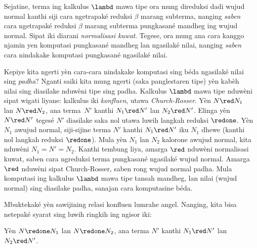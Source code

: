 \documentclass[../../../include/open-logic-section]{subfiles}
\begin{document}
Sejatine, terma ing kalkulus $\lambd$ mawa tipe ora mung direduksi dadi
wujud normal kanthi siji cara ngetrapaké reduksi $\beta$ marang
subterma, nanging \emph{saben} cara ngetrapaké reduksi $\beta$ marang
subterma pungkasané mandheg ing wujud normal. Sipat iki diarani
\emph{normalisasi kuwat}. Tegese, ora mung ana cara kanggo njamin yen
komputasi pungkasané mandheg lan ngasilaké nilai, nanging \emph{saben}
cara nindakake komputasi pungkasané ngasilaké nilai.

Kepiye kita ngerti yèn cara-cara nindakake komputasi sing béda ngasilaké
nilai sing \emph{padha}? Nganti saiki kita mung ngerti (saka panglestaren
tipe) yèn kabèh nilai sing diasilake nduwèni tipe sing padha. Kalkulus
$\lambd$ mawa tipe nduwèni sipat wigati liyane: kalkulus iki
\emph{konfluen}, utawa \emph{Church-Rosser}. Yèn $N \red N_1$ lan $N \red
N_2$, ana terma~$N'$ kanthi $N_1 \red N'$ lan $N_2 \red N'$. Elinga
yèn $N \red N'$ tegesé $N'$ diasilake saka nol utawa luwih langkah
reduksi $\redone$. Yèn $N_1$ awujud normal, siji-sijine terma $N'$
kanthi $N_1 \red N'$ iku $N_1$ dhewe (kanthi nol langkah reduksi
$\redone$). Mula yèn $N_1$ lan $N_2$ kalorone awujud normal, kita
nduwèni $N_1 = N' = N_2$. Kanthi tembung liya, amarga $\red$
nduwèni normalisasi kuwat, saben cara ngreduksi terma pungkasané
ngasilaké wujud normal. Amarga $\red$ nduwèni sipat Church-Rosser,
saben rong wujud normal padha. Mula komputasi ing kalkulus $\lambd$
mawa tipe tansah mandheg, lan nilai (wujud normal) sing diasilake
padha, sanajan cara komputasine béda.

Mbuktekaké yèn sawijining relasi konfluen lumrahe angel. Nanging,
kita bisa netepaké syarat sing luwih ringkih ing ngisor iki:

\begin{prop}
Yèn $N \redone N_1$ lan $N \redone N_2$, ana terma $N'$ kanthi
$N_1 \red N'$ lan $N_2 \red N'$.
\end{prop}
\end{document}
